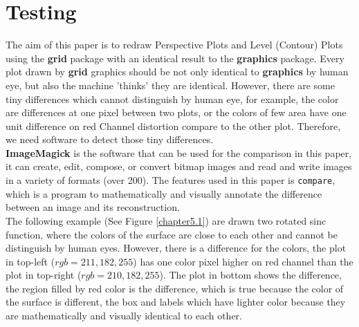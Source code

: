 \documentclass[11pt]{report}
\begin{document}
\chapter{Testing}
The aim of this paper is to redraw Perspective Plots and Level (Contour) Plots using the \textbf{grid} package with an identical result to the \textbf{graphics} package. Every plot drawn by \textbf{grid} graphics should be not only identical to \textbf{graphics} by human eye, but also the machine 'thinks' they are identical. However, there are some tiny differences which cannot distinguish by human eye, for example, the color are differences at one pixel between two plots, or the colors of few area have one unit difference on red Channel distortion compare to the other plot. Therefore, we need software to detect those tiny differences.\\

\textbf{ImageMagick} \citep{ImageMagick} is the software that can be used for the comparison in this paper, it can create, edit, compose, or convert bitmap images and read and write images in a variety of formats (over 200). The features used in this paper is \texttt{compare}, which is a program to mathematically and visually annotate the difference between an image and its reconstruction.\\

The following example (See Figure \ref{chapter5.1}) are drawn two rotated sinc function, where the colors of the surface are close to each other and cannot be distinguish by human eyes. However, there is a difference for the colors, the plot in top-left ($rgb = 211, 182, 255$) has one color pixel higher on red channel than the plot in top-right ($rgb = 210, 182, 255$). The plot in bottom shows the difference, the region filled by red color is the difference, which is true because the color of the surface is different, the box and labels which have lighter color because they are mathematically and visually identical to each other. \\
\end{document}
